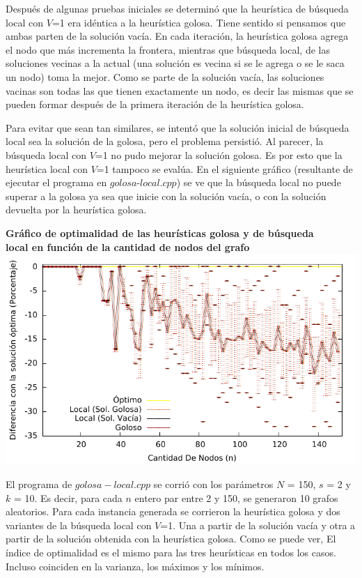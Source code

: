 \par{Después de
algunas pruebas iniciales se determinó que la heurística de búsqueda local con
$V$=1 era idéntica a la heurística golosa. Tiene sentido si pensamos que
ambas parten de la solución vacía. En cada iteración, la heurística golosa
agrega el nodo que más incrementa la frontera, mientras que búsqueda local,
de las soluciones vecinas a la actual (una solución es vecina si se le agrega o
se le saca un nodo) toma la mejor. Como se parte de la solución vacía, las
soluciones vacinas son todas las que tienen exactamente un nodo, es decir las
mismas que se pueden formar después de la primera iteración de la heurística
golosa.}\\

\par{Para evitar que sean tan similares, se intentó que la solución inicial de
búsqueda local sea la solución de la golosa, pero el problema persistió. Al
parecer, la búsqueda local con $V$=1 no pudo mejorar la solución golosa. Es por
esto que la heurística local con $V$=1 tampoco se evalúa. En el siguiente
gráfico (resultante de ejecutar el programa en $golosa$-$local.cpp$) se ve que
la búsqueda local no puede superar a la golosa ya sea que inicie con la solución
vacía, o con la solución devuelta por la heurística golosa.}
\newpage
\begin{center}
\textbf{Gráfico de optimalidad de las heurísticas golosa y de búsqueda\\
local en función de la cantidad de nodos del grafo}
\includegraphics[scale=1.3]{imgs/golosa-local_150_2_10.pdf}
\end{center}

\par{El programa de $golosa-local.cpp$ se corrió con los parámetros $N$ =
150, $s$ = 2 y $k$ = 10. Es decir, para cada $n$ entero par entre 2 y 150, se
generaron 10 grafos aleatorios. Para cada instancia generada se corrieron la
heurística golosa y dos variantes de la búsqueda local con $V$=1. Una a partir
de la solución vacía y otra a partir de la solución obtenida con la heurística
golosa. Como se puede ver, El índice de optimalidad es el mismo para las tres
heurísticas en todos los casos. Incluso coinciden en la varianza, los máximos
y los mínimos.}

